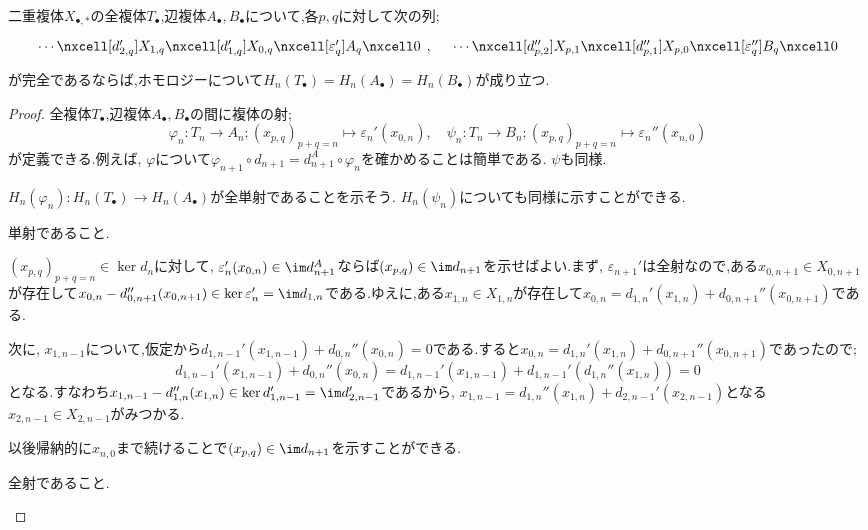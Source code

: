 \begin{thm}\label{thm:辺複体のhomologyは同型}
	二重複体$X_{\bullet,\ast}$の全複体$T_\bullet$,辺複体$A_\bullet,B_\bullet$について,各$p,q$に対して次の列;
	\[\begin{tikzcd}
		\cdots\nxcell[d_{2,q}']X_{1,q}\nxcell[d_{1,q}']X_{0,q}\nxcell[\varepsilon_q']A_q\nxcell0
	\end{tikzcd},\quad\begin{tikzcd}
		\cdots\nxcell[d_{p,2}'']X_{p,1}\nxcell[d_{p,1}'']X_{p,0}\nxcell[\varepsilon_q'']B_q\nxcell0
	\end{tikzcd}\]
	が完全であるならば,ホモロジーについて$H_n(T_\bullet)=H_n(A_\bullet)=H_n(B_\bullet)$が成り立つ.
\end{thm}
\begin{proof}
	全複体$T_\bullet$,辺複体$A_\bullet,B_\bullet$の間に複体の射;
	\[\varphi_n:T_n\to A_n;(x_{p,q})_{p+q=n}\mapsto\varepsilon_n'(x_{0,n}),\quad\psi_n:T_n\to B_n;(x_{p,q})_{p+q=n}\mapsto\varepsilon_n''(x_{n,0})\]
	が定義できる.例えば, $\varphi$について$\varphi_{n+1}\circ d_{n+1}=d_{n+1}^A\circ\varphi_n$を確かめることは簡単である. $\psi$も同様.

	$H_n(\varphi_n):H_n(T_\bullet)\to H_n(A_\bullet)$が全単射であることを示そう. $H_n(\psi_n)$についても同様に示すことができる.
	
	\begin{step}
		\item 単射であること.
		
		$(x_{p,q})_{p+q=n}\in\ker d_n$に対して, $\varepsilon_n'(x_{0,n})\in\im d_{n+1}^A$ならば$(x_{p,q})\in\im d_{n+1}$を示せばよい.まず, $\varepsilon_{n+1}'$は全射なので,ある$x_{0,n+1}\in X_{0,n+1}$が存在して$x_{0,n}-d_{0,n+1}''(x_{0,n+1})\in\ker\varepsilon_n'=\im d_{1,n}$である.ゆえに,ある$x_{1,n}\in X_{1,n}$が存在して$x_{0,n}=d_{1,n}'(x_{1,n})+d_{0,n+1}''(x_{0,n+1})$である.
		
		次に, $x_{1,n-1}$について,仮定から$d_{1,n-1}'(x_{1,n-1})+d_{0,n}''(x_{0,n})=0$である.すると$x_{0,n}=d_{1,n}'(x_{1,n})+d_{0,n+1}''(x_{0,n+1})$であったので;
		\[d_{1,n-1}'(x_{1,n-1})+d_{0,n}''(x_{0,n})=d_{1,n-1}'(x_{1,n-1})+d_{1,n-1}'(d_{1,n}''(x_{1,n}))=0\]
		となる.すなわち$x_{1,n-1}-d_{1,n}''(x_{1,n})\in\ker d_{1,n-1}'=\im d_{2,n-1}'$であるから, $x_{1,n-1}=d_{1,n}''(x_{1,n})+d_{2,n-1}'(x_{2,n-1})$となる$x_{2,n-1}\in X_{2,n-1}$がみつかる.
		
		以後帰納的に$x_{n,0}$まで続けることで$(x_{p,q})\in\im d_{n+1}$を示すことができる.
		
		\item 全射であること.
		

\end{step}
\end{proof}
